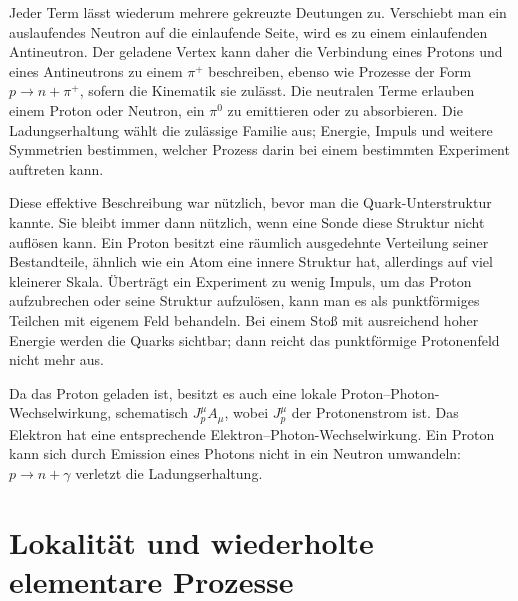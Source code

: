 Jeder Term lässt wiederum mehrere gekreuzte Deutungen zu. Verschiebt man ein auslaufendes Neutron auf die einlaufende Seite, wird es zu einem einlaufenden Antineutron. Der geladene Vertex kann daher die Verbindung eines Protons und eines Antineutrons zu einem \(\pi^+\) beschreiben, ebenso wie Prozesse der Form \(p\to n+\pi^+\), sofern die Kinematik sie zulässt. Die neutralen Terme erlauben einem Proton oder Neutron, ein \(\pi^0\) zu emittieren oder zu absorbieren. Die Ladungserhaltung wählt die zulässige Familie aus; Energie, Impuls und weitere Symmetrien bestimmen, welcher Prozess darin bei einem bestimmten Experiment auftreten kann.

Diese effektive Beschreibung war nützlich, bevor man die Quark-Unterstruktur kannte. Sie bleibt immer dann nützlich, wenn eine Sonde diese Struktur nicht auflösen kann. Ein Proton besitzt eine räumlich ausgedehnte Verteilung seiner Bestandteile, ähnlich wie ein Atom eine innere Struktur hat, allerdings auf viel kleinerer Skala. Überträgt ein Experiment zu wenig Impuls, um das Proton aufzubrechen oder seine Struktur aufzulösen, kann man es als punktförmiges Teilchen mit eigenem Feld behandeln. Bei einem Stoß mit ausreichend hoher Energie werden die Quarks sichtbar; dann reicht das punktförmige Protonenfeld nicht mehr aus.

Da das Proton geladen ist, besitzt es auch eine lokale Proton--Photon-Wechselwirkung, schematisch \(J_p^\mu A_\mu\), wobei \(J_p^\mu\) der Protonenstrom ist. Das Elektron hat eine entsprechende Elektron--Photon-Wechselwirkung. Ein Proton kann sich durch Emission eines Photons nicht in ein Neutron umwandeln: \(p\to n+\gamma\) verletzt die Ladungserhaltung.

\begin{classroomqa}
\end{classroomqa}

\section{Lokalität und wiederholte elementare Prozesse}

